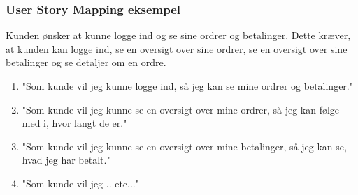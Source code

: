\subsubsection{User Story Mapping eksempel}
Kunden ønsker at kunne logge ind og se sine ordrer og betalinger. Dette kræver, at kunden kan logge ind, se en oversigt over sine ordrer, se en oversigt over sine betalinger og se detaljer om en ordre.
\begin{enumerate}
    \item "Som kunde vil jeg kunne logge ind, så jeg kan se mine ordrer og betalinger."
    \item "Som kunde vil jeg kunne se en oversigt over mine ordrer, så jeg kan følge med i, hvor langt de er."
    \item "Som kunde vil jeg kunne se en oversigt over mine betalinger, så jeg kan se, hvad jeg har betalt."
    \item "Som kunde vil jeg .. etc..."
    \label{item:user-story-mapping-eksempel}
\end{enumerate}

